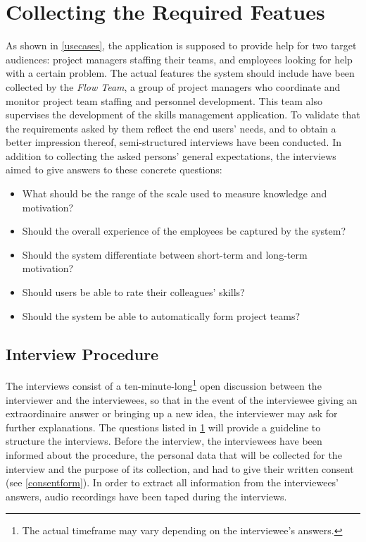 \section{Collecting the Required Featues}
\label{interviewquestions}
As shown in \ref{usecases}, the application is supposed to provide help for two target audiences: project managers staffing their teams, and employees looking for help with a certain problem.
The actual features the system should include have been collected by the \textit{Flow Team}, a group of project managers who coordinate and monitor project team staffing and personnel development. This team also supervises the development of the skills management application. To validate that the requirements asked by them reflect the end users' needs, and to obtain a better impression thereof, semi-structured interviews have been conducted. In addition to collecting the asked persons' general expectations, the interviews aimed to give answers to these concrete questions:
\begin{itemize}
	\item What should be the range of the scale used to measure knowledge and motivation?
	\item Should the overall experience of the employees be captured by the system?
	\item Should the system differentiate between short-term and long-term motivation?
	\item Should users be able to rate their colleagues' skills?
	\item Should the system be able to automatically form project teams?
\end{itemize}

\subsection{Interview Procedure}
The interviews consist of a ten-minute-long\footnote{The actual timeframe may vary depending on the interviewee's answers.} open discussion between the interviewer and the interviewees, so that in the event of the interviewee giving an extraordinaire answer or bringing up a new idea, the interviewer may ask for further explanations. The questions listed in \ref{interviewquestions} will provide a guideline to structure the interviews. Before the interview, the interviewees have been informed about the procedure, the personal data that will be collected for the interview and the purpose of its collection, and had to give their written consent (see \ref{consentform}).
In order to extract all information from the interviewees' answers, audio recordings have been taped during the interviews.

